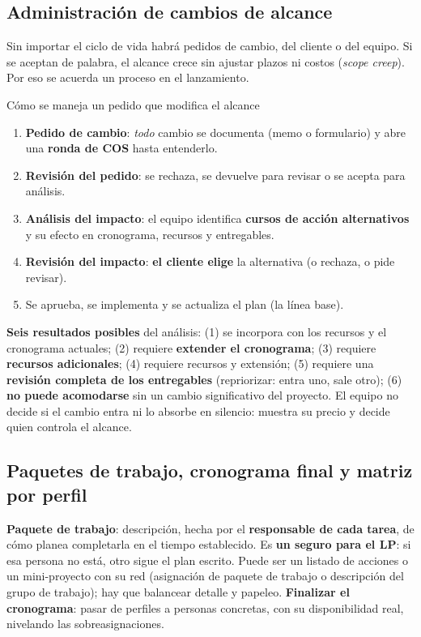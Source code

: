\documentclass[11pt,a4paper]{article}
\begin{document}
\subsection{Administración de cambios de alcance}
Sin importar el ciclo de vida habrá pedidos de cambio, del cliente o del equipo. Si se aceptan de palabra, el
alcance crece sin ajustar plazos ni costos (\emph{scope creep}). Por eso se acuerda un proceso en el lanzamiento.
\begin{defbox}{Cómo se maneja un pedido que modifica el alcance}
\begin{enumerate}
  \item \textbf{Pedido de cambio}: \emph{todo} cambio se documenta (memo o formulario) y abre una \textbf{ronda
  de COS} hasta entenderlo.
  \item \textbf{Revisión del pedido}: se rechaza, se devuelve para revisar o se acepta para análisis.
  \item \textbf{Análisis del impacto}: el equipo identifica \textbf{cursos de acción alternativos} y su efecto en
  cronograma, recursos y entregables.
  \item \textbf{Revisión del impacto}: \textbf{el cliente elige} la alternativa (o rechaza, o pide revisar).
  \item Se aprueba, se implementa y se actualiza el plan (la línea base).
\end{enumerate}
\end{defbox}
\textbf{Seis resultados posibles} del análisis: (1) se incorpora con los recursos y el cronograma actuales; (2)
requiere \textbf{extender el cronograma}; (3) requiere \textbf{recursos adicionales}; (4) requiere recursos y
extensión; (5) requiere una \textbf{revisión completa de los entregables} (repriorizar: entra uno, sale otro);
(6) \textbf{no puede acomodarse} sin un cambio significativo del proyecto. El equipo no decide si el cambio
entra ni lo absorbe en silencio: muestra su precio y decide quien controla el alcance.

\subsection{Paquetes de trabajo, cronograma final y matriz por perfil}
\label{sec:matriz}
\textbf{Paquete de trabajo}: descripción, hecha por el \textbf{responsable de cada tarea}, de cómo planea
completarla en el tiempo establecido. Es \textbf{un seguro para el LP}: si esa persona no está, otro sigue el
plan escrito. Puede ser un listado de acciones o un mini-proyecto con su red (asignación de paquete de trabajo o
descripción del grupo de trabajo); hay que balancear detalle y papeleo. \textbf{Finalizar el cronograma}:
pasar de perfiles a personas concretas, con su disponibilidad real, nivelando las sobreasignaciones.
\end{document}
